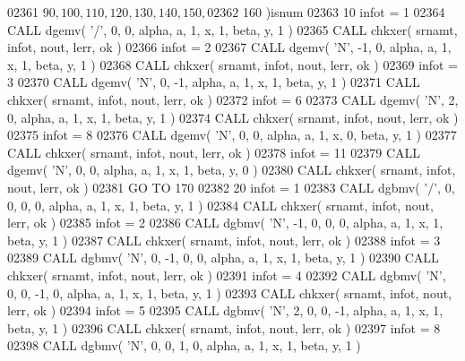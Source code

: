 \begin{DoxyCode}
02361      $        90, 100, 110, 120, 130, 140, 150,
02362      $        160 )isnum
02363    10 infot = 1
02364       \textcolor{keyword}{CALL }dgemv( \textcolor{stringliteral}{'/'}, 0, 0, alpha, a, 1, x, 1, beta, y, 1 )
02365       \textcolor{keyword}{CALL }chkxer( srnamt, infot, nout, lerr, ok )
02366       infot = 2
02367       \textcolor{keyword}{CALL }dgemv( \textcolor{stringliteral}{'N'}, -1, 0, alpha, a, 1, x, 1, beta, y, 1 )
02368       \textcolor{keyword}{CALL }chkxer( srnamt, infot, nout, lerr, ok )
02369       infot = 3
02370       \textcolor{keyword}{CALL }dgemv( \textcolor{stringliteral}{'N'}, 0, -1, alpha, a, 1, x, 1, beta, y, 1 )
02371       \textcolor{keyword}{CALL }chkxer( srnamt, infot, nout, lerr, ok )
02372       infot = 6
02373       \textcolor{keyword}{CALL }dgemv( \textcolor{stringliteral}{'N'}, 2, 0, alpha, a, 1, x, 1, beta, y, 1 )
02374       \textcolor{keyword}{CALL }chkxer( srnamt, infot, nout, lerr, ok )
02375       infot = 8
02376       \textcolor{keyword}{CALL }dgemv( \textcolor{stringliteral}{'N'}, 0, 0, alpha, a, 1, x, 0, beta, y, 1 )
02377       \textcolor{keyword}{CALL }chkxer( srnamt, infot, nout, lerr, ok )
02378       infot = 11
02379       \textcolor{keyword}{CALL }dgemv( \textcolor{stringliteral}{'N'}, 0, 0, alpha, a, 1, x, 1, beta, y, 0 )
02380       \textcolor{keyword}{CALL }chkxer( srnamt, infot, nout, lerr, ok )
02381       \textcolor{keywordflow}{GO TO} 170
02382    20 infot = 1
02383       \textcolor{keyword}{CALL }dgbmv( \textcolor{stringliteral}{'/'}, 0, 0, 0, 0, alpha, a, 1, x, 1, beta, y, 1 )
02384       \textcolor{keyword}{CALL }chkxer( srnamt, infot, nout, lerr, ok )
02385       infot = 2
02386       \textcolor{keyword}{CALL }dgbmv( \textcolor{stringliteral}{'N'}, -1, 0, 0, 0, alpha, a, 1, x, 1, beta, y, 1 )
02387       \textcolor{keyword}{CALL }chkxer( srnamt, infot, nout, lerr, ok )
02388       infot = 3
02389       \textcolor{keyword}{CALL }dgbmv( \textcolor{stringliteral}{'N'}, 0, -1, 0, 0, alpha, a, 1, x, 1, beta, y, 1 )
02390       \textcolor{keyword}{CALL }chkxer( srnamt, infot, nout, lerr, ok )
02391       infot = 4
02392       \textcolor{keyword}{CALL }dgbmv( \textcolor{stringliteral}{'N'}, 0, 0, -1, 0, alpha, a, 1, x, 1, beta, y, 1 )
02393       \textcolor{keyword}{CALL }chkxer( srnamt, infot, nout, lerr, ok )
02394       infot = 5
02395       \textcolor{keyword}{CALL }dgbmv( \textcolor{stringliteral}{'N'}, 2, 0, 0, -1, alpha, a, 1, x, 1, beta, y, 1 )
02396       \textcolor{keyword}{CALL }chkxer( srnamt, infot, nout, lerr, ok )
02397       infot = 8
02398       \textcolor{keyword}{CALL }dgbmv( \textcolor{stringliteral}{'N'}, 0, 0, 1, 0, alpha, a, 1, x, 1, beta, y, 1 )

\end{DoxyCode}
